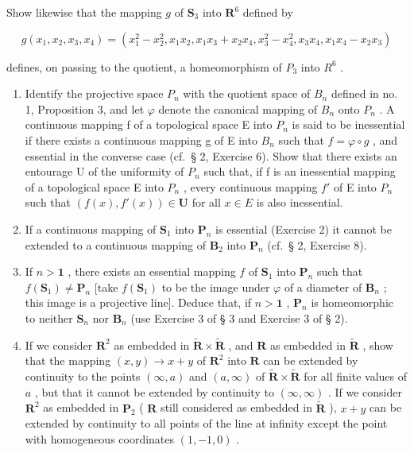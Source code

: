 Show likewise that the mapping \(g\) of \(\mathbf{S}_3\) into \(\mathbf{R}^6\) defined by

\[
g \left(x _ {1}, x _ {2}, x _ {3}, x _ {4}\right) = \left(x _ {1} ^ {2} - x _ {2} ^ {2}, x _ {1} x _ {2}, x _ {1} x _ {3} + x _ {2} x _ {4}, x _ {3} ^ {2} - x _ {4} ^ {2}, x _ {3} x _ {4}, x _ {1} x _ {4} - x _ {2} x _ {3}\right)
\]

defines, on passing to the quotient, a homeomorphism of \(P_{3}\) into \(R^{6}\) .

\begin{enumerate}
\def\labelenumi{\arabic{enumi})}
\setcounter{enumi}{1}
\item
  Identify the projective space \(P_{n}\) with the quotient space of \(B_{n}\) defined in no. 1, Proposition 3, and let \(\varphi\) denote the canonical mapping of \(B_{n}\) onto \(P_{n}\) . A continuous mapping f of a topological space E into \(P_{n}\) is said to be inessential if there exists a continuous mapping g of E into \(B_{n}\) such that \(f = \varphi \circ g\) , and essential in the converse case (cf.~§ 2, Exercise 6). Show that there exists an entourage U of the uniformity of \(P_{n}\) such that, if f is an inessential mapping of a topological space E into \(P_{n}\) , every continuous mapping \(f'\) of E into \(P_{n}\) such that \((f(x), f'(x)) \in \mathbf{U}\) for all \(x \in E\) is also inessential.
\item
  If a continuous mapping of \(\mathbf{S}_1\) into \(\mathbf{P}_n\) is essential (Exercise 2) it cannot be extended to a continuous mapping of \(\mathbf{B}_2\) into \(\mathbf{P}_n\) (cf.~§ 2, Exercise 8).
\item
  If \(n > \mathbf{1}\) , there exists an essential mapping \(f\) of \(\mathbf{S}_1\) into \(\mathbf{P}_n\) such that \(f(\mathbf{S}_1) \neq \mathbf{P}_n\) {[}take \(f(\mathbf{S}_1)\) to be the image under \(\varphi\) of a diameter of \(\mathbf{B}_n\) ; this image is a projective line{]}. Deduce that, if \(n > \mathbf{1}\) , \(\mathbf{P}_n\) is homeomorphic to neither \(\mathbf{S}_n\) nor \(\mathbf{B}_n\) (use Exercise 3 of § 3 and Exercise 3 of § 2).
\item
  If we consider \(\mathbf{R}^2\) as embedded in \(\tilde{\mathbf{R}} \times \tilde{\mathbf{R}}\) , and \(\mathbf{R}\) as embedded in \(\tilde{\mathbf{R}}\) , show that the mapping \((x, y) \to x + y\) of \(\mathbf{R}^2\) into \(\mathbf{R}\) can be extended by continuity to the points \((\infty, a)\) and \((a, \infty)\) of \(\tilde{\mathbf{R}} \times \tilde{\mathbf{R}}\) for all finite values of \(a\) , but that it cannot be extended by continuity to \((\infty, \infty)\) . If we consider \(\mathbf{R}^2\) as embedded in \(\mathbf{P}_2\) ( \(\mathbf{R}\) still considered as embedded in \(\tilde{\mathbf{R}}\) ), \(x + y\) can be extended by continuity to all points of the line at infinity except the point with homogeneous coordinates \((1, -1, 0)\) .
\end{enumerate}

